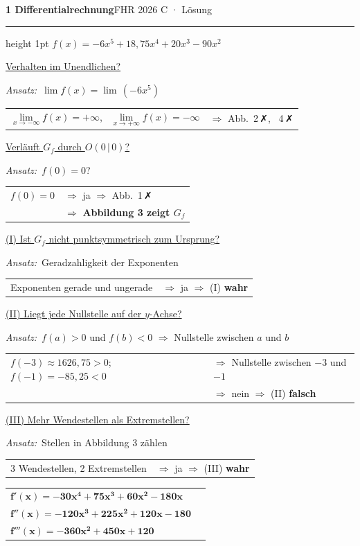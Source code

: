 \documentclass[11pt,a4paper]{article}
\makeatletter
\newcommand{\g}[1]{{\small\color{grau}#1}}
\newcommand{\teil}[2]{\par\filbreak\vspace{12pt}\noindent\makebox[1.6em][l]{\textbf{#1}}\underline{#2}\par\vspace{2pt}}
\newcommand{\sub}[1]{\par\vspace{8pt}\noindent\hspace{1.6em}\underline{#1}\par\vspace{2pt}}
\newcommand{\ansatz}[1]{\noindent\hspace{1.6em}\textit{Ansatz:}\ #1\par\vspace{3pt}}
\newenvironment{weg}{\par\noindent\hspace{3.2em}\renewcommand{\arraystretch}{1.45}\begin{tabular}{@{}l@{\quad}l@{}}}{\end{tabular}\par}
\newcommand{\B}[1]{\boldsymbol{#1}}
\newcommand{\trenn}{\par\vspace{8pt}{\color{grau!50}\hrule}}
\makeatother
\begin{document}
{\large\bfseries 1 Differentialrechnung}\hfill\g{FHR 2026 C · Lösung}\par
\vspace{3pt}\hrule height 1pt\vspace{6pt}
$f(x)=-6x^5+18{,}75x^4+20x^3-90x^2$\par

\teil{a)}{Verhalten im Unendlichen?}
\ansatz{$\lim f(x)=\lim\,(-6x^5)$}
\begin{weg}
$\lim\limits_{x\to-\infty}f(x)=+\infty$, \ $\lim\limits_{x\to+\infty}f(x)=-\infty$ & $\Rightarrow$ Abb.\ 2\,✗, \ 4\,✗\\
\end{weg}
\sub{Verläuft $G_f$ durch $O(0\,|\,0)$?}
\ansatz{$f(0)=0$?}
\begin{weg}
$f(0)=0$ & $\Rightarrow$ ja $\Rightarrow$ Abb.\ 1\,✗\\
 & $\Rightarrow$ \textbf{Abbildung 3 zeigt $G_f$}\\
\end{weg}
\trenn

\teil{b)}{(I) Ist $G_f$ nicht punktsymmetrisch zum Ursprung?}
\ansatz{Geradzahligkeit der Exponenten}
\begin{weg}
Exponenten gerade und ungerade & $\Rightarrow$ ja $\Rightarrow$ (I) \textbf{wahr}\\
\end{weg}
\sub{(II) Liegt jede Nullstelle auf der $y$-Achse?}
\ansatz{$f(a)>0$ und $f(b)<0$ $\Rightarrow$ Nullstelle zwischen $a$ und $b$}
\begin{weg}
$f(-3)\approx1626{,}75>0$; \ $f(-1)=-85{,}25<0$ & $\Rightarrow$ Nullstelle zwischen $-3$ und $-1$\\
 & $\Rightarrow$ nein $\Rightarrow$ (II) \textbf{falsch}\\
\end{weg}
\sub{(III) Mehr Wendestellen als Extremstellen?}
\ansatz{Stellen in Abbildung 3 zählen}
\begin{weg}
3 Wendestellen, 2 Extremstellen & $\Rightarrow$ ja $\Rightarrow$ (III) \textbf{wahr}\\
\end{weg}
\trenn

\teil{c)}{}
\begin{weg}
$\B{f'(x)=-30x^4+75x^3+60x^2-180x}$ & \\
$\B{f''(x)=-120x^3+225x^2+120x-180}$ & \\
$\B{f'''(x)=-360x^2+450x+120}$ & \\
\end{weg}
\trenn
\end{document}
